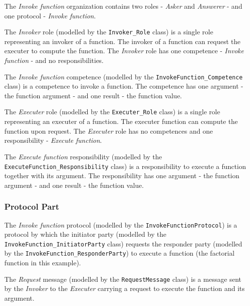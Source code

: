 The \textit{Invoke function} organization contains two roles - \textit{Asker} and \textit{Answerer} - and one protocol - \textit{Invoke function}.

The \textit{Invoker} role (modelled by the \texttt{Invoker\_Role} class) is a single role representing an invoker of a function.
The invoker of a function can request the executer to compute the function.
The \textit{Invoker} role has one competence - \textit{Invoke function} - and no responsibilities.

The \textit{Invoke function} competence (modelled by the \texttt{InvokeFunction\_Competence} class) is a competence to invoke a function.
The competence has one argument - the function argument - and one result - the function value.

The \textit{Executer} role (modelled by the \texttt{Executer\_Role} class) is a single role representing an executer of a function.
The executer function can compute the function upon request.
The \textit{Executer} role has no competences and one responsibility - \textit{Execute function}.

The \textit{Execute function} responsibility (modelled by the \texttt{ExecuteFunction\_Responsibility} class) is a responsibility to execute a function together with its argument.
The responsibility has one argument - the function argument - and one result - the function value.

\subsubsection*{Protocol Part}

The \textit{Invoke function} protocol (modelled by the \texttt{InvokeFunctionProtocol}) is a protocol by which the initiator party (modelled by the \texttt{InvokeFunction\_InitiatorParty} class) requests the responder party (modelled by the \texttt{InvokeFunction\_ResponderParty}) to execute a function (the factorial function in this example).

The \textit{Request} message (modelled by the \texttt{RequestMessage} class) is a message sent by the \textit{Invoker} to the \textit{Executer} carrying a request to execute the function and its argument.

